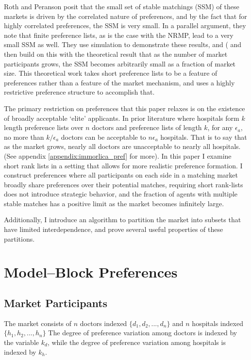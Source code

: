 \documentclass[WP]{AEA}
\begin{document}
Roth and Peranson posit that the small set of stable matchings (SSM) of these markets is driven by the correlated nature of preferences, and by the fact that for highly correlated preferences, the SSM is very small.  In a parallel argument, they note that finite preference lists, as is the case with the NRMP, lead to a very small SSM as well.  They use simulation to demonstrate these results, and (\cite{Immorlica2005} and then \cite{Kojima2009} build on this with the theoretical result that as the number of market participants grows, the SSM becomes arbitrarily small as a fraction of market size. This theoretical work takes short preference lists to be a feature of preferences rather than a feature of the market mechanism, and uses a highly restrictive preference structure to accomplish that. 

The primary restriction on preferences that this paper relaxes is on the existence of broadly acceptable `elite' applicants. In prior literature where hospitals form $k$ length preference lists over $n$ doctors and preference lists of length $k$,  for any $\epsilon_a$, no more than $k/\epsilon_a$ doctors can be acceptable to $n\epsilon_a$ hospitals. That is to say that as the market grows, nearly all doctors are unacceptable to nearly all hospitals. (See appendix \ref{appendix:immorlica_pref} for more).  
In this paper I examine short rank lists in a setting that allows for more realistic preference formation. I construct preferences where all participants on each side in a matching market broadly share preferences over their potential matches, requiring short rank-lists does not introduce strategic behavior, and the fraction of agents with multiple stable matches has a positive limit as the market becomes infinitely large.

Additionally, I introduce an algorithm to partition the market into subsets that have limited interdependence, and prove several useful properties of these partitions.

\section{Model--Block Preferences}
\subsection{Market Participants}

The market consists of $n$ doctors  indexed $\{ d_1, d_2, ... ,d_n\}$ and  $n$ hospitals  indexed $\{ h_1, h_2, ... ,h_n\}$ The degree of preference variation among doctors is indexed by the variable $k_d$, while the degree of preference variation among hospitals is indexed by $k_h$.
	
\end{document}
